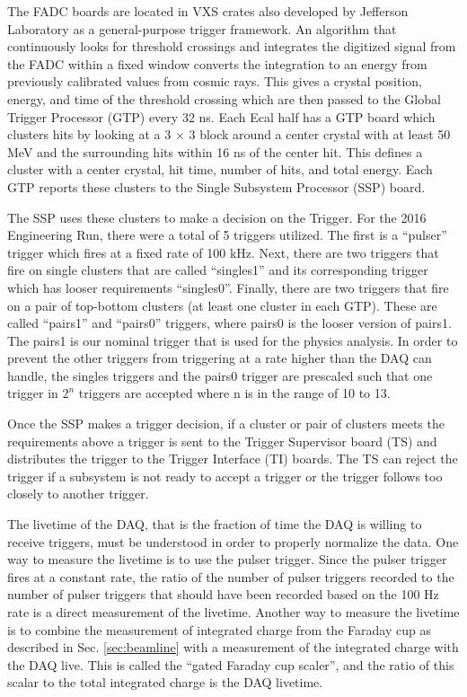 The FADC boards are located in VXS crates also developed by Jefferson Laboratory as a general-purpose trigger framework. An algorithm that continuously looks for threshold crossings and integrates the digitized signal from the FADC within a fixed window converts the integration to an energy from previously calibrated values from cosmic rays. This gives a crystal position, energy, and time of the threshold crossing which are then passed to the Global Trigger Processor (GTP) every 32 ns. Each Ecal half has a GTP board which clusters hits by looking at a 3 $\times$ 3 block around a center crystal with at least 50 MeV and the surrounding hits within 16 ns of the center hit. This defines a cluster with a center crystal, hit time, number of hits, and total energy. Each GTP reports these clusters to the Single Subsystem Processor (SSP) board.

The SSP uses these clusters to make a decision on the Trigger. For the 2016 Engineering Run, there were a total of 5 triggers utilized. The first is a ``pulser'' trigger which fires at a fixed rate of 100 kHz. Next, there are two triggers that fire on single clusters that are called ``singles1'' and its corresponding trigger which has looser requirements ``singles0''. Finally, there are two triggers that fire on a pair of top-bottom clusters (at least one cluster in each GTP). These are called ``pairs1'' and ``pairs0'' triggers, where pairs0 is the looser version of pairs1. The pairs1 is our nominal trigger that is used for the physics analysis. In order to prevent the other triggers from triggering at a rate higher than the DAQ can handle, the singles triggers and the pairs0 trigger are prescaled such that one trigger in $2^n$ triggers are accepted where n is in the range of 10 to 13.

Once the SSP makes a trigger decision, if a cluster or pair of clusters meets the requirements above a trigger is sent to the Trigger Supervisor board (TS) and distributes the trigger to the Trigger Interface (TI) boards. The TS can reject the trigger if a subsystem is not ready to accept a trigger or the trigger follows too closely to another trigger.

The livetime of the DAQ, that is the fraction of time the DAQ is willing to receive triggers, must be understood in order to properly normalize the data. One way to measure the livetime is to use the pulser trigger. Since the pulser trigger fires at a constant rate, the ratio of the number of pulser triggers recorded to the number of pulser triggers that should have been recorded based on the 100 Hz rate is a direct measurement of the livetime. Another way to measure the livetime is to combine the measurement of integrated charge from the Faraday cup as described in Sec. \ref{sec:beamline} with a measurement of the integrated charge with the DAQ live. This is called the ``gated Faraday cup scaler'', and the ratio of this scalar to the total integrated charge is the DAQ livetime.

